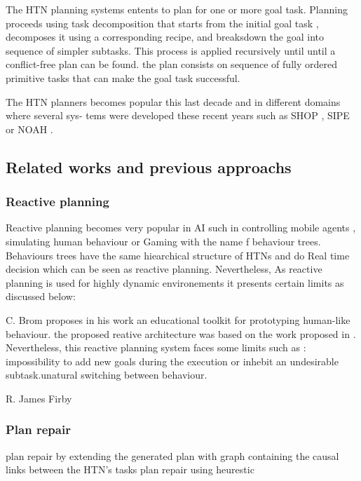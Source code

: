 \documentclass[conference]{IEEEtran}
\begin{document}
	\par The HTN planning systems entents to plan for one or more goal task. Planning proceeds using task decomposition that starts from the initial goal task , decomposes it using a corresponding recipe, and breaksdown the goal into sequence of simpler subtasks. This process is applied recursively until until a conflict-free plan can be found. the plan consists on sequence of fully ordered primitive tasks that can make the goal task successful. 
	\par The HTN planners becomes popular this last decade and in different domains where several sys-
	tems were developed these recent years such as SHOP \cite{nau1999shop}, SIPE \cite{wilkins1988practical} or NOAH  \cite{sacerdoti1975structure}.
	
	
	
	\subsection{Related works and previous approachs}
	
	\subsubsection{Reactive planning}
	Reactive planning becomes very popular in AI such in controlling mobile agents \cite{beaudry2005reactive}, simulating human behaviour \cite{bryson2001modularity} or Gaming with the name f behaviour trees. Behaviours trees have the same hiearchical structure of HTNs and do Real time decision which can be seen as reactive planning.
	Nevertheless, As reactive planning is used for highly dynamic environements it presents certain limits as discussed below: 
	
	C. Brom \cite{brom2005hierarchical} proposes in his work an educational toolkit for prototyping human-like behaviour. the proposed reative architecture was based on the work proposed in \cite{bryson2001modularity}. Nevertheless, this reactive planning system faces some limits such as : 
	impossibility to add new goals during the execution or inhebit an undesirable subtask.unatural switching between behaviour. 
	
	R. James Firby  \cite{firby1987investigation} 
	
	
	\subsubsection{Plan repair}
	plan repair by extending the generated plan with graph containing the causal links between the HTN's tasks
	\cite{ayan2007hotride}  \cite{warfield2007adaptation} \cite{van2005plan} \cite{boella2002replanning}
	plan repair using heurestic \cite{hayashi2006dynagent}
	
\end{document}
